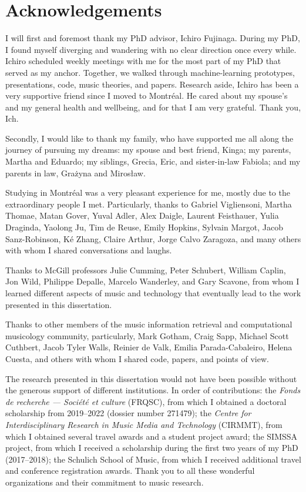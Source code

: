 \chapter*{Acknowledgements}
\label{chap:chap0-ack}

I will first and foremost thank my PhD advisor, Ichiro Fujinaga.
During my PhD, I found myself diverging and wandering with no clear direction once every while.
Ichiro scheduled weekly meetings with me for the most part of my PhD that served as my anchor. 
Together, we walked through machine-learning prototypes, presentations, code, music theories, and papers. 
Research aside, Ichiro has been a very supportive friend since I moved to Montr\'eal. 
He cared about my spouse's and my general health and wellbeing, and for that I am very grateful. 
Thank you, Ich.

Secondly, I would like to thank my family, who have supported me all along the journey of pursuing my dreams: my spouse and best friend, Kinga; my parents, Martha and Eduardo; my siblings, Grecia, Eric, and sister-in-law Fabiola; and my parents in law, Gra\.zyna and Miros\l{}aw.

Studying in Montr\'eal was a very pleasant experience for me, mostly due to the extraordinary people I met.
Particularly, thanks to Gabriel Vigliensoni, Martha Thomae, Matan Gover, Yuval Adler, Alex Daigle, Laurent Feisthauer, Yulia Draginda, Yaolong Ju, Tim de Reuse, Emily Hopkins, Sylvain Margot, Jacob Sanz-Robinson, K\'e Zhang, Claire Arthur, Jorge Calvo Zaragoza, and many others with whom I shared conversations and laughs.

Thanks to McGill professors Julie Cumming, Peter Schubert, William Caplin, Jon Wild, Philippe Depalle, Marcelo Wanderley, and Gary Scavone, from whom I learned different aspects of music and technology that eventually lead to the work presented in this dissertation.

Thanks to other members of the music information retrieval and computational musicology community, particularly, Mark Gotham, Craig Sapp, Michael Scott Cuthbert, Jacob Tyler Walls, Reinier de Valk, Emilia Parada-Cabaleiro, Helena Cuesta, and others with whom I shared code, papers, and points of view. 

The research presented in this dissertation would not have been possible without the generous support of different institutions. In order of contributions: the \emph{Fonds de recherche --- Soci\'et\'e et culture} (FRQSC), from which I obtained a doctoral scholarship from 2019--2022 (dossier number 271479); the \emph{Centre for Interdisciplinary Research in Music Media and Technology} (CIRMMT), from which I obtained several travel awards and a student project award; the SIMSSA project, from which I received a scholarship during the first two years of my PhD (2017--2018); the Schulich School of Music, from which I received additional travel and conference registration awards. Thank you to all these wonderful organizations and their commitment to music research.

